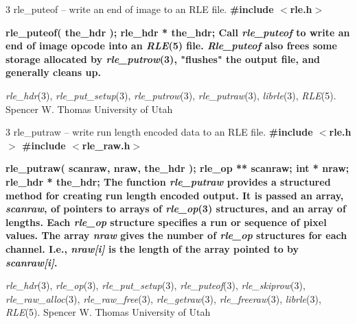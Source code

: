 %
%
%
 3
rle\_puteof -- write an end of image to an RLE file.
\bf
\#include $<$rle.h$>$
\par\vspace{1.0\baselineskip}
\bf
rle\_puteof( the\_hdr );
\nwl
\bf
rle\_hdr * the\_hdr;
Call
{\it rle\_puteof}
to write an end of image opcode into an
{\it RLE}{\rm (5)}
file.  
{\it Rle\_puteof}
also frees some storage allocated by
{\it rle\_putrow}{\rm (3),}
"flushes" the output file, and generally cleans up.
\raggedright
{\it rle\_hdr}{\rm (3),}
{\it rle\_put\_setup}{\rm (3),}
{\it rle\_putrow}{\rm (3),}
{\it rle\_putraw}{\rm (3),}
{\it librle}{\rm (3),}
{\it RLE}{\rm (5).}
Spencer W. Thomas
\nwl
University of Utah
\newpage


%
%
%
 3
rle\_putraw -- write run length encoded data to an RLE file.
\bf
\#include $<$rle.h$>$
\nwl
\bf
\#include $<$rle\_raw.h$>$
\par\vspace{1.0\baselineskip}
\bf
rle\_putraw( scanraw, nraw, the\_hdr );
\nwl
\bf
rle\_op ** scanraw;
\nwl
\bf
int * nraw;
\nwl
\bf
rle\_hdr * the\_hdr;
The function
{\it rle\_putraw}
provides a structured method for creating 
run length encoded output.  It is passed an array,
{\it scanraw}{\rm ,}
of pointers to arrays of 
{\it rle\_op}{\rm (3)}
structures, and an array of lengths.  Each
{\it rle\_op}
structure specifies a run or sequence of pixel values.  The array
{\it nraw}
gives the number of 
{\it rle\_op}
structures for each channel.  I.e.,
{\it nraw[i]}
is the length of the array pointed to by
{\it scanraw[i]}{\rm .}
\raggedright
{\it rle\_hdr}{\rm (3),}
{\it rle\_op}{\rm (3),}
{\it rle\_put\_setup}{\rm (3),}
{\it rle\_puteof}{\rm (3),}
{\it rle\_skiprow}{\rm (3),}
{\it rle\_raw\_alloc}{\rm (3),}
{\it rle\_raw\_free}{\rm (3),}
{\it rle\_getraw}{\rm (3),}
{\it rle\_freeraw}{\rm (3),}
{\it librle}{\rm (3),}
{\it RLE}{\rm (5).}
Spencer W. Thomas
\nwl
University of Utah
\newpage


